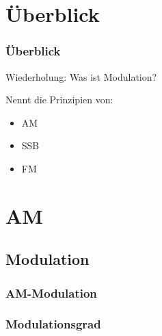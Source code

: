 

\subtitle{Technik Klasse A 12: \\
          Modulation und Demodulation \\[2em]}
\date{Stand 11.06.2015}


\section{Überblick}

\begin{frame}
    \frametitle{Überblick}

    Wiederholung: Was ist Modulation? \bigskip

    Nennt die Prinzipien von:

    \begin{itemize}
        \item AM
        \item SSB
        \item FM
    \end{itemize}

\end{frame}

\section{AM}

\subsection{Modulation}

\begin{frame}
    \frametitle{AM-Modulation}


\end{frame}

\subsubsection{Modulationsgrad}

